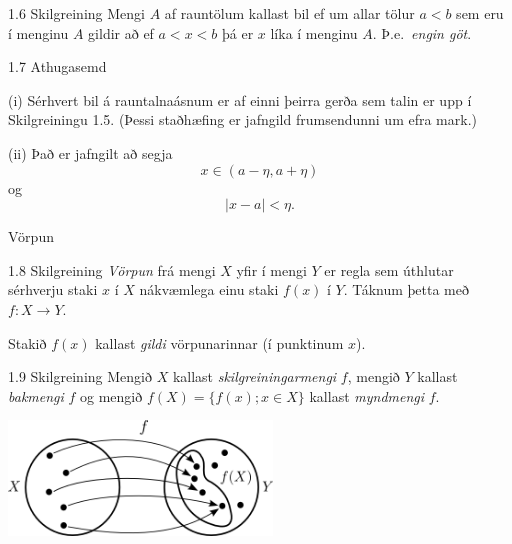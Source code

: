 \documentclass[icelandic,a4paper,12pt]{article}
\begin{document}
\begin{frame}
\begin{block}{1.6 Skilgreining} Mengi $A$ af rauntölum kallast bil ef um
allar tölur $a<b$ sem eru í menginu $A$ gildir að ef $a<x<b$ þá er $x$
líka í menginu $A$. \pause Þ.e.~\emph{engin göt}.
\end{block}

\pause

\begin{block}{1.7 Athugasemd}  

(i) Sérhvert bil á rauntalnaásnum er af
einni þeirra gerða sem talin er upp í Skilgreiningu 1.5.   (Þessi
staðhæfing er jafngild frumsendunni um efra mark.)

\pause

(ii) Það er jafngilt að segja 
$$x \in (a-\eta,a+\eta)$$ 
og 
$$|x-a| < \eta.$$
\end{block}
\end{frame}

\begin{frame}{Vörpun}
\begin{block}{1.8 Skilgreining}
\emph{Vörpun} frá mengi $X$ yfir í mengi $Y$ er regla sem úthlutar sérhverju
staki $x$ í $X$ nákvæmlega einu staki $f(x)$ í $Y$. Táknum þetta með
$f:X \to Y$. 

Stakið $f(x)$ kallast \emph{gildi} vörpunarinnar (í punktinum $x$).
\end{block}

\pause

\begin{block}
{1.9 Skilgreining}
Mengið $X$ kallast \emph{skilgreiningarmengi} $f$, 
mengið $Y$ kallast \emph{bakmengi} $f$ og 
mengið $f(X) = \{ f(x); x \in X \}$ kallast \emph{myndmengi} $f$.
\end{block}

\begin{center}
 \includegraphics[width=7cm,keepaspectratio=true]{./myndir/kafli01/02_Mynd_vorpunar.png}
\end{center}
\end{frame}
\end{document}

